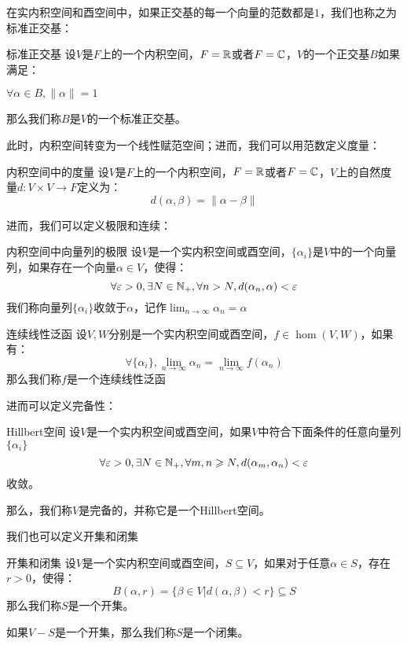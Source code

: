 \documentclass[12pt, a4paper, oneside, UTF8]{ctexbook}
\begin{document}
			在实内积空间和酉空间中，如果正交基的每一个向量的范数都是$1$，我们也称之为标准正交基：
			\begin{defn}{标准正交基}{}
				设$V$是$F$上的一个内积空间，$F=\mathbb{R}$或者$F=\mathbb{C}$，$V$的一个正交基$B$如果满足：

				$\forall \alpha \in B,\|\alpha \|=1$

				那么我们称$B$是$V$的一个标准正交基。
			\end{defn}

			此时，内积空间转变为一个线性赋范空间；进而，我们可以用范数定义度量：
			\begin{defn}{内积空间中的度量}{}
				设$V$是$F$上的一个内积空间，$F=\mathbb{R}$或者$F=\mathbb{C}$，$V$上的自然度量$d:V \times V \to F$定义为：
				\begin{equation}
					d(\alpha ,\beta )=\|\alpha -\beta \|
				\end{equation}
			\end{defn}
			进而，我们可以定义极限和连续：
			\begin{defn}{内积空间中向量列的极限}{}
				设$V$是一个实内积空间或酉空间，$\{\alpha_i\}$是$V$中的一个向量列，如果存在一个向量$\alpha \in V$，使得：
				\begin{equation}
					\forall \varepsilon > 0,\exists N \in \mathbb{N}_+,\forall n > N,d(\alpha_n,\alpha ) < \varepsilon 
				\end{equation}
				我们称向量列$\{\alpha_i\}$收敛于$\alpha $，记作$\lim_{n \to \infty}\alpha_n=\alpha $
			\end{defn}
			\begin{defn}{连续线性泛函}{}
				设$V,W$分别是一个实内积空间或酉空间，$f \in \hom(V,W)$，如果有：
				\begin{equation}
					\forall \{\alpha_i\},\lim_{n \to \infty}\alpha_n=\lim_{n \to \infty}f(\alpha_n)
				\end{equation}
				那么我们称$f$是一个连续线性泛函
			\end{defn}
			进而可以定义完备性：
			\begin{defn}{Hillbert空间}{}
				设$V$是一个实内积空间或酉空间，如果$V$中符合下面条件的任意向量列$\{\alpha_i\}$
				\begin{equation}
					\forall \varepsilon > 0,\exists N \in \mathbb{N}_+,\forall m,n \geqslant N,d(\alpha_m,\alpha_n) < \varepsilon 
				\end{equation}
				收敛。

				那么，我们称$V$是完备的，并称它是一个Hillbert空间。
			\end{defn}
			我们也可以定义开集和闭集
			\begin{defn}{开集和闭集}{}
				设$V$是一个实内积空间或酉空间，$S \subseteq V$，如果对于任意$\alpha \in S$，存在$r > 0$，使得：
				\begin{equation}
					B(\alpha ,r)=\{\beta \in V | d(\alpha ,\beta ) < r\} \subseteq S
				\end{equation}
				那么我们称$S$是一个开集。

				如果$V-S$是一个开集，那么我们称$S$是一个闭集。
			\end{defn}
\end{document}
